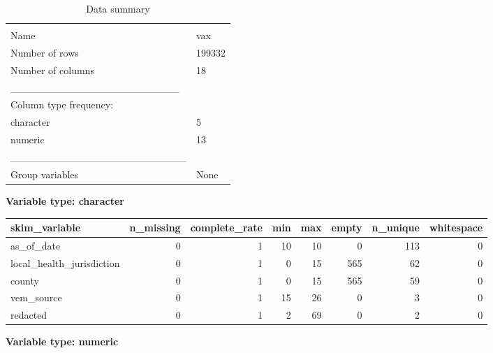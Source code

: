 \documentclass[
]{article}
\begin{document}
\begin{longtable}[]{@{}ll@{}}
\caption{Data summary}\tabularnewline
\toprule
& \\
\midrule
\endfirsthead
\toprule
& \\
\midrule
\endhead
Name & vax \\
Number of rows & 199332 \\
Number of columns & 18 \\
\_\_\_\_\_\_\_\_\_\_\_\_\_\_\_\_\_\_\_\_\_\_\_ & \\
Column type frequency: & \\
character & 5 \\
numeric & 13 \\
\_\_\_\_\_\_\_\_\_\_\_\_\_\_\_\_\_\_\_\_\_\_\_\_ & \\
Group variables & None \\
\bottomrule
\end{longtable}

\textbf{Variable type: character}

\begin{longtable}[]{@{}lrrrrrrr@{}}
\toprule
skim\_variable & n\_missing & complete\_rate & min & max & empty &
n\_unique & whitespace \\
\midrule
\endhead
as\_of\_date & 0 & 1 & 10 & 10 & 0 & 113 & 0 \\
local\_health\_jurisdiction & 0 & 1 & 0 & 15 & 565 & 62 & 0 \\
county & 0 & 1 & 0 & 15 & 565 & 59 & 0 \\
vem\_source & 0 & 1 & 15 & 26 & 0 & 3 & 0 \\
redacted & 0 & 1 & 2 & 69 & 0 & 2 & 0 \\
\bottomrule
\end{longtable}

\textbf{Variable type: numeric}
\end{document}

